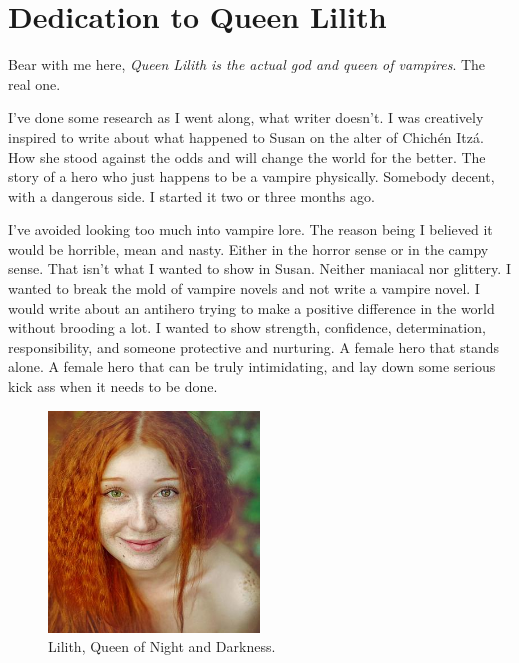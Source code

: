 \documentclass[12pt,twoside,onecolumn,openright,extrafontsizes]{memoir}
\def\chichenitza*{Chich\'{e}n Itz\'{a}}
\begin{document}
\begin{center}
\itshape{}
\end{center}

\frontmatter
\pagestyle{mystyle}

\chapter*{Dedication to Queen Lilith}
{Bear with me here, \textit{Queen Lilith is the actual god and queen of vampires}. The real one. 
	
I've done some research as I went along, what writer doesn't. I was creatively inspired to write about what happened to Susan on the alter of \chichenitza*. How she stood against the odds and will change the world for the better. The story of a hero who just happens to be a vampire physically. Somebody decent, with a dangerous side. I started it two or three months ago.

I've avoided looking too much into vampire lore. The reason being I believed it would be horrible, mean and nasty. Either in the horror sense or in the campy sense. That isn't what I wanted to show in Susan. Neither maniacal nor glittery. I wanted to break the mold of vampire novels and not write a vampire novel. I would write about an antihero trying to make a positive difference in the world without brooding a lot. I wanted to show strength, confidence, determination, responsibility, and someone protective and nurturing. A female hero that stands alone. A female hero that can be truly intimidating, and lay down some serious kick ass when it needs to be done.

	\begin{figure}
		\centering
		\includegraphics[width=0.50\textwidth]{Images/ginger-girl}
		\\ {\small Lilith, Queen of Night and Darkness.}
	\end{figure}

}
\end{document}
